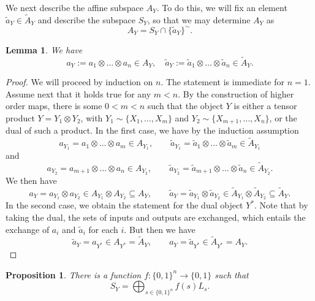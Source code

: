 \documentclass[12pt]{article}
\newtheorem{lemma}{Lemma}
\newtheorem{prop}{Proposition}
\theoremstyle{definition}
\theoremstyle{remark}
\begin{document}
We next describe the affine subspace $A_Y$. To do this, we will fix an element 
$\tilde a_Y\in \tilde A_Y$ and describe the subspace $S_Y$, so that we may determine $A_Y$ as
\[
A_Y=S_Y\cap\{\tilde a_Y\}^\sim.
\]


\begin{lemma}\label{lemma:La} We have
\[
a_Y:=a_{1}\otimes \dots \otimes a_{n}\in A_Y,\quad \tilde a_Y:=\tilde a_{1}\otimes
\dots \otimes \tilde a_{n}\in \tilde A_Y.
\]

\end{lemma}

\begin{proof} We will proceed by induction on $n$.  The statement is immediate for $n=1$.
Assume next that it holds true for any $m<n$. By the construction of higher order maps, 
there is some $0<m<n$ such that 
the object $Y$ is either a tensor product
$Y=Y_1\otimes Y_2$, with $Y_1\sim\{X_{1},\dots,X_{m}\}$ and
$Y_2\sim\{X_{m+1},\dots,X_{n}\}$, or
the dual of such a product. In the first case, we have by the induction assumption
\[
a_{Y_1}=a_{1}\otimes\dots\otimes
a_{m}\in A_{Y_1},  \qquad \tilde a_{Y_1}=\tilde a_{1}\otimes\dots\otimes
\tilde a_{m}\in \tilde A_{Y_1}
\]
and 
\[
a_{Y_2}=a_{m+1}\otimes\dots\otimes
a_{n}\in A_{Y_2},  \qquad \tilde a_{Y_2}=\tilde a_{m+1}\otimes\dots\otimes
\tilde a_{n}\in \tilde A_{Y_2}.
\]
We then have
\[
a_Y=a_{Y_1}\otimes a_{Y_2}\in A_{Y_1}\otimes A_{Y_2}\subseteq A_Y,\qquad 
\tilde a_Y=\tilde a_{Y_1}\otimes \tilde a_{Y_2}\in \tilde A_{Y_1}\otimes \tilde
A_{Y_2}\subseteq \tilde A_Y.
\]
In the second case, we obtain  the statement for the dual object $Y^*$. Note that by taking
the dual, the sets of inputs and outputs are exchanged, which entails  the exchange of
$a_i$ and $\tilde a_i$ for each $i$. But then we have
\[
\tilde a_Y=a_{Y^*}\in A_{Y^*}=\tilde A_Y,\qquad a_Y=\tilde a_{Y^*}\in \tilde A_{Y^*}=A_Y.
\]

\end{proof}



\begin{prop}\label{prop:boolean}
There is a function $f:\{0,1\}^n\to \{0,1\}$ such that 
\[
S_Y=\bigoplus_{s\in \{0,1\}^n} f(s) L_s.
\]


\end{prop}
\end{document}
